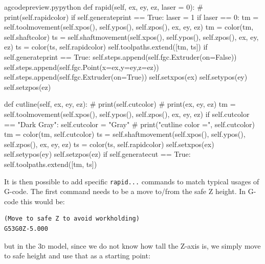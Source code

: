\documentclass{ltxdoc}
\begin{document}
\lstset{firstnumber=\thegcpy}
\begin{writecode}{a}{gcodepreview.py}{python}
    def rapid(self, ex, ey, ez, laser = 0):
#        print(self.rapidcolor)
        if self.generateprint == True:
            laser = 1
        if laser == 0:
            tm = self.toolmovement(self.xpos(), self.ypos(), self.zpos(), ex, ey, ez)
            tm = color(tm, self.shaftcolor)
            ts = self.shaftmovement(self.xpos(), self.ypos(), self.zpos(), ex, ey, ez)
            ts = color(ts, self.rapidcolor)
            self.toolpaths.extend([tm, ts])
        if self.generateprint == True:
            self.steps.append(self.fgc.Extruder(on=False))
            self.steps.append(self.fgc.Point(x=ex,y=ey,z=ez))
            self.steps.append(self.fgc.Extruder(on=True))
        self.setxpos(ex)
        self.setypos(ey)
        self.setzpos(ez)

    def cutline(self, ex, ey, ez):
#        print(self.cutcolor)
#        print(ex, ey, ez)
        tm = self.toolmovement(self.xpos(), self.ypos(), self.zpos(), ex, ey, ez)
        if self.cutcolor == "Dark Gray":
            self.cutcolor = "Gray"
#        print("cutline color =", self.cutcolor)
        tm = color(tm, self.cutcolor)
        ts = self.shaftmovement(self.xpos(), self.ypos(), self.zpos(), ex, ey, ez)
        ts = color(ts, self.rapidcolor)
        self.setxpos(ex)
        self.setypos(ey)
        self.setzpos(ez)
        if self.generatecut == True:
            self.toolpaths.extend([tm, ts])

\end{writecode}
\addtocounter{gcpy}{34}

It is then possible to add specific \verb|rapid...| commands to match typical usages of G-code. The first command needs to be a move to/from the safe Z height. In G-code this would be:

\begin{verbatim}
(Move to safe Z to avoid workholding)
G53G0Z-5.000
\end{verbatim}

\noindent but in the \textsc{3d} model, since we do not know how tall the Z-axis is, we simply move to safe height and use that as a starting point:
\end{document}
